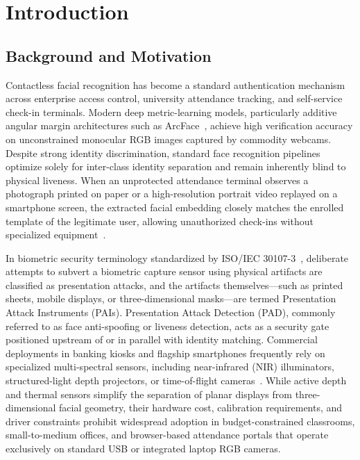 \chapter{Introduction}
\label{chap:introduction}

\section{Background and Motivation}
\label{sec:background_motivation}

Contactless facial recognition has become a standard authentication mechanism across enterprise access control, university attendance tracking, and self-service check-in terminals. Modern deep metric-learning models, particularly additive angular margin architectures such as ArcFace~\cite{deng2019arcface}, achieve high verification accuracy on unconstrained monocular RGB images captured by commodity webcams. Despite strong identity discrimination, standard face recognition pipelines optimize solely for inter-class identity separation and remain inherently blind to physical liveness. When an unprotected attendance terminal observes a photograph printed on paper or a high-resolution portrait video replayed on a smartphone screen, the extracted facial embedding closely matches the enrolled template of the legitimate user, allowing unauthorized check-ins without specialized equipment~\cite{anjos2011counter, yu2023deep}.

In biometric security terminology standardized by ISO/IEC 30107-3~\cite{iso30107_3}, deliberate attempts to subvert a biometric capture sensor using physical artifacts are classified as presentation attacks, and the artifacts themselves---such as printed sheets, mobile displays, or three-dimensional masks---are termed Presentation Attack Instruments (PAIs). Presentation Attack Detection (PAD), commonly referred to as face anti-spoofing or liveness detection, acts as a security gate positioned upstream of or in parallel with identity matching. Commercial deployments in banking kiosks and flagship smartphones frequently rely on specialized multi-spectral sensors, including near-infrared (NIR) illuminators, structured-light depth projectors, or time-of-flight cameras~\cite{george2020biometric}. While active depth and thermal sensors simplify the separation of planar displays from three-dimensional facial geometry, their hardware cost, calibration requirements, and driver constraints prohibit widespread adoption in budget-constrained classrooms, small-to-medium offices, and browser-based attendance portals that operate exclusively on standard USB or integrated laptop RGB cameras.

